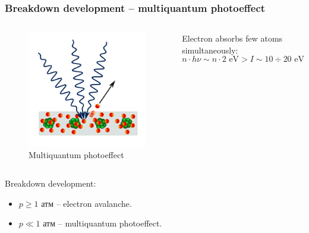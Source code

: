 \documentclass{beamer}
\begin{document}
	\begin{frame}
		\frametitle{Breakdown development -- multiquantum photoeffect}
		
		\begin{columns}
			\begin{figure}
				\centering
				\includegraphics[width=0.9\linewidth]{res/multiphoton.png}
				\caption*{Multiquantum photoeffect}
			\end{figure}
			
			Electron absorbs few atoms simultaneously: 
			$$n \cdot h\nu \sim n \cdot 2 \text{ eV} > I \sim 10 \div 20 \text{ eV}$$
		\end{columns}
		
		Breakdown development:
		\begin{itemize}
			\item $p \geqslant 1\text{ атм}$ -- electron avalanche.
			\item $p \ll 1\text{ атм}$ -- multiquantum photoeffect.
		\end{itemize}
	\end{frame}
	
\end{document}
